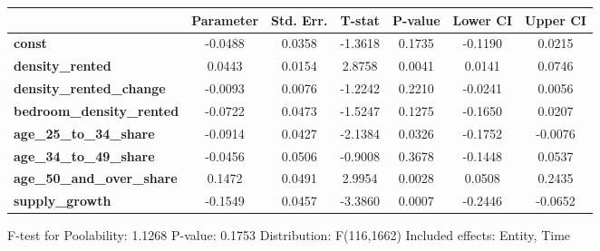 \begin{center}
\begin{tabular}{lclc}
\bottomrule
\end{tabular}
\begin{tabular}{lcccccc}
                                   & \textbf{Parameter} & \textbf{Std. Err.} & \textbf{T-stat} & \textbf{P-value} & \textbf{Lower CI} & \textbf{Upper CI}  \\
\midrule
\textbf{const}                     &      -0.0488       &       0.0358       &     -1.3618     &      0.1735      &      -0.1190      &       0.0215       \\
\textbf{density\_rented}           &       0.0443       &       0.0154       &      2.8758     &      0.0041      &       0.0141      &       0.0746       \\
\textbf{density\_rented\_change}   &      -0.0093       &       0.0076       &     -1.2242     &      0.2210      &      -0.0241      &       0.0056       \\
\textbf{bedroom\_density\_rented}  &      -0.0722       &       0.0473       &     -1.5247     &      0.1275      &      -0.1650      &       0.0207       \\
\textbf{age\_25\_to\_34\_share}    &      -0.0914       &       0.0427       &     -2.1384     &      0.0326      &      -0.1752      &      -0.0076       \\
\textbf{age\_34\_to\_49\_share}    &      -0.0456       &       0.0506       &     -0.9008     &      0.3678      &      -0.1448      &       0.0537       \\
\textbf{age\_50\_and\_over\_share} &       0.1472       &       0.0491       &      2.9954     &      0.0028      &       0.0508      &       0.2435       \\
\textbf{supply\_growth}            &      -0.1549       &       0.0457       &     -3.3860     &      0.0007      &      -0.2446      &      -0.0652       \\
\bottomrule
\end{tabular}
\end{center}

F-test for Poolability: 1.1268 \newline
 P-value: 0.1753 \newline
 Distribution: F(116,1662) \newline
  \newline
 Included effects: Entity, Time